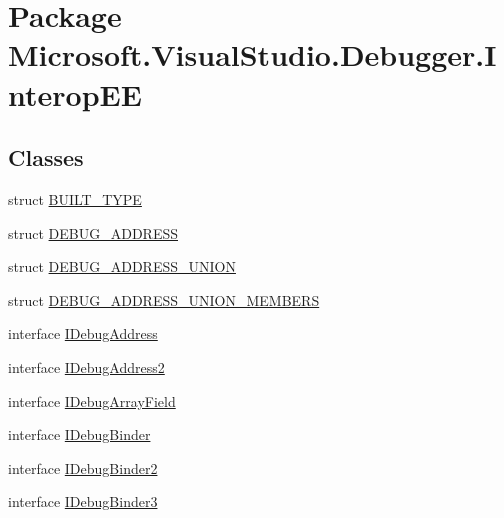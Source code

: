 \hypertarget{namespace_microsoft_1_1_visual_studio_1_1_debugger_1_1_interop_e_e}{\section{Package Microsoft.\+Visual\+Studio.\+Debugger.\+Interop\+E\+E}
\label{namespace_microsoft_1_1_visual_studio_1_1_debugger_1_1_interop_e_e}
}
\subsection*{Classes}
\begin{DoxyCompactItemize}
\item 
struct \hyperlink{struct_microsoft_1_1_visual_studio_1_1_debugger_1_1_interop_e_e_1_1_b_u_i_l_t___t_y_p_e}{B\+U\+I\+L\+T\+\_\+\+T\+Y\+P\+E}
\item 
struct \hyperlink{struct_microsoft_1_1_visual_studio_1_1_debugger_1_1_interop_e_e_1_1_d_e_b_u_g___a_d_d_r_e_s_s}{D\+E\+B\+U\+G\+\_\+\+A\+D\+D\+R\+E\+S\+S}
\item 
struct \hyperlink{struct_microsoft_1_1_visual_studio_1_1_debugger_1_1_interop_e_e_1_1_d_e_b_u_g___a_d_d_r_e_s_s___u_n_i_o_n}{D\+E\+B\+U\+G\+\_\+\+A\+D\+D\+R\+E\+S\+S\+\_\+\+U\+N\+I\+O\+N}
\item 
struct \hyperlink{struct_microsoft_1_1_visual_studio_1_1_debugger_1_1_interop_e_e_1_1_d_e_b_u_g___a_d_d_r_e_s_s___u_n_i_o_n___m_e_m_b_e_r_s}{D\+E\+B\+U\+G\+\_\+\+A\+D\+D\+R\+E\+S\+S\+\_\+\+U\+N\+I\+O\+N\+\_\+\+M\+E\+M\+B\+E\+R\+S}
\item 
interface \hyperlink{interface_microsoft_1_1_visual_studio_1_1_debugger_1_1_interop_e_e_1_1_i_debug_address}{I\+Debug\+Address}
\item 
interface \hyperlink{interface_microsoft_1_1_visual_studio_1_1_debugger_1_1_interop_e_e_1_1_i_debug_address2}{I\+Debug\+Address2}
\item 
interface \hyperlink{interface_microsoft_1_1_visual_studio_1_1_debugger_1_1_interop_e_e_1_1_i_debug_array_field}{I\+Debug\+Array\+Field}
\item 
interface \hyperlink{interface_microsoft_1_1_visual_studio_1_1_debugger_1_1_interop_e_e_1_1_i_debug_binder}{I\+Debug\+Binder}
\item 
interface \hyperlink{interface_microsoft_1_1_visual_studio_1_1_debugger_1_1_interop_e_e_1_1_i_debug_binder2}{I\+Debug\+Binder2}
\item 
interface \hyperlink{interface_microsoft_1_1_visual_studio_1_1_debugger_1_1_interop_e_e_1_1_i_debug_binder3}{I\+Debug\+Binder3}

\end{DoxyCompactItemize}
